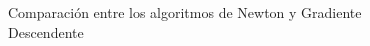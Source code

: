 \documentclass[a4]{article}
\begin{document}
\begin{figure}[H]
	\centering    
	\caption{Comparación entre los algoritmos de Newton y Gradiente Descendente}
	\label{fig:new}
\end{figure}
\end{document}
